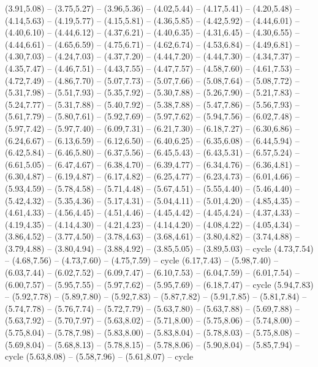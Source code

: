 \expandafter\def\csname geo:Heute:Ost\endcsname{
  (3.91,5.08) -- (3.75,5.27) -- (3.96,5.36) -- (4.02,5.44) -- (4.17,5.41) -- (4.20,5.48) -- (4.14,5.63) -- (4.19,5.77) -- (4.15,5.81) -- (4.36,5.85) -- (4.42,5.92) -- (4.44,6.01) -- (4.40,6.10) -- (4.44,6.12) -- (4.37,6.21) -- (4.40,6.35) -- (4.31,6.45) -- (4.30,6.55) -- (4.44,6.61) -- (4.65,6.59) -- (4.75,6.71) -- (4.62,6.74) -- (4.53,6.84) -- (4.49,6.81) -- (4.30,7.03) -- (4.24,7.03) -- (4.37,7.20) -- (4.44,7.20) -- (4.44,7.30) -- (4.34,7.37) -- (4.35,7.47) -- (4.46,7.51) -- (4.43,7.55) -- (4.47,7.57) -- (4.58,7.60) -- (4.61,7.53) -- (4.72,7.49) -- (4.86,7.70) -- (5.07,7.73) -- (5.07,7.66) -- (5.08,7.64) -- (5.08,7.72) -- (5.31,7.98) -- (5.51,7.93) -- (5.35,7.92) -- (5.30,7.88) -- (5.26,7.90) -- (5.21,7.83) -- (5.24,7.77) -- (5.31,7.88) -- (5.40,7.92) -- (5.38,7.88) -- (5.47,7.86) -- (5.56,7.93) -- (5.61,7.79) -- (5.80,7.61) -- (5.92,7.69) -- (5.97,7.62) -- (5.94,7.56) -- (6.02,7.48) -- (5.97,7.42) -- (5.97,7.40) -- (6.09,7.31) -- (6.21,7.30) -- (6.18,7.27) -- (6.30,6.86) -- (6.24,6.67) -- (6.13,6.59) -- (6.12,6.50) -- (6.40,6.25) -- (6.35,6.08) -- (6.44,5.94) -- (6.42,5.84) -- (6.46,5.80) -- (6.37,5.56) -- (6.45,5.43) -- (6.43,5.31) -- (6.57,5.24) -- (6.61,5.05) -- (6.47,4.67) -- (6.38,4.70) -- (6.39,4.77) -- (6.34,4.76) -- (6.36,4.81) -- (6.30,4.87) -- (6.19,4.87) -- (6.17,4.82) -- (6.25,4.77) -- (6.23,4.73) -- (6.01,4.66) -- (5.93,4.59) -- (5.78,4.58) -- (5.71,4.48) -- (5.67,4.51) -- (5.55,4.40) -- (5.46,4.40) -- (5.42,4.32) -- (5.35,4.36) -- (5.17,4.31) -- (5.04,4.11) -- (5.01,4.20) -- (4.85,4.35) -- (4.61,4.33) -- (4.56,4.45) -- (4.51,4.46) -- (4.45,4.42) -- (4.45,4.24) -- (4.37,4.33) -- (4.19,4.35) -- (4.14,4.30) -- (4.21,4.23) -- (4.14,4.20) -- (4.08,4.22) -- (4.05,4.34) -- (3.86,4.52) -- (3.77,4.50) -- (3.78,4.63) -- (3.68,4.61) -- (3.80,4.82) -- (3.74,4.88) -- (3.79,4.88) -- (3.80,4.94) -- (3.88,4.92) -- (3.85,5.05) -- (3.89,5.03) -- cycle
  (4.73,7.54) -- (4.68,7.56) -- (4.73,7.60) -- (4.75,7.59) -- cycle
  (6.17,7.43) -- (5.98,7.40) -- (6.03,7.44) -- (6.02,7.52) -- (6.09,7.47) -- (6.10,7.53) -- (6.04,7.59) -- (6.01,7.54) -- (6.00,7.57) -- (5.95,7.55) -- (5.97,7.62) -- (5.95,7.69) -- (6.18,7.47) -- cycle
  (5.94,7.83) -- (5.92,7.78) -- (5.89,7.80) -- (5.92,7.83) -- (5.87,7.82) -- (5.91,7.85) -- (5.81,7.84) -- (5.74,7.78) -- (5.76,7.74) -- (5.72,7.79) -- (5.63,7.80) -- (5.63,7.88) -- (5.69,7.88) -- (5.63,7.92) -- (5.70,7.97) -- (5.63,8.02) -- (5.71,8.00) -- (5.75,8.06) -- (5.74,8.00) -- (5.75,8.04) -- (5.78,7.98) -- (5.83,8.00) -- (5.83,8.04) -- (5.78,8.03) -- (5.75,8.08) -- (5.69,8.04) -- (5.68,8.13) -- (5.78,8.15) -- (5.78,8.06) -- (5.90,8.04) -- (5.85,7.94) -- cycle
  (5.63,8.08) -- (5.58,7.96) -- (5.61,8.07) -- cycle}
